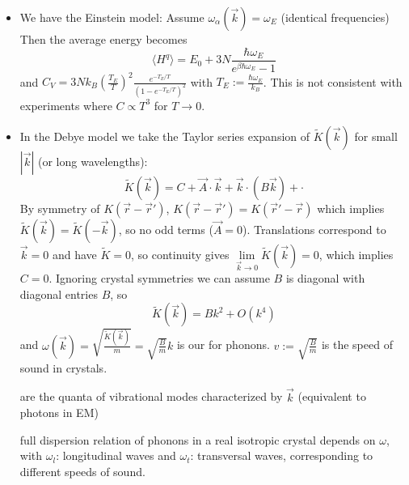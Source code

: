 \documentclass[12pt, a4paper, oneside, openright, titlepage]{book}
\begin{document}
\begin{itemize}
    \item We have the Einstein model: Assume $\omega_{\alpha}(\vec{k}) = \omega_E$ (identical frequencies) Then the average energy becomes \begin{equation*}
            \langle H^q\rangle = E_0 + 3N\frac{\hbar\omega_E}{e^{\beta\hbar\omega_E}-1}
    \end{equation*}
        and $C_V = 3Nk_B\left(\frac{T_E}{T}\right)^2\frac{e^{-T_E/T}}{(1-e^{-T_E/T})^2}$ with $T_E := \frac{\hbar\omega_E}{k_B}$. This is not consistent with experiments where $C \propto T^3$ for $T\rightarrow 0$.
    \item In the Debye model we take the Taylor series expansion of $\tilde{K}(\vec{k})$ for small $|\vec{k}|$ (or long wavelengths): \begin{equation*}
            \tilde{K}(\vec{k}) = C+\vec{A}\cdot\vec{k}+\vec{k}\cdot(B\vec{k})+\cdot
    \end{equation*}
        By symmetry of $K(\vec{r}-\vec{r}')$, $K(\vec{r}-\vec{r}') = K(\vec{r}'-\vec{r})$ which implies $\tilde{K}(\vec{k}) = \tilde{K}(-\vec{k})$, so no odd terms ($\vec{A} = 0$). Translations correspond to $\vec{k} = 0$ and have $\tilde{K} = 0$, so continuity gives $\lim\limits_{\vec{k}\rightarrow 0}\tilde{K}(\vec{k}) = 0$, which implies $C = 0$. Ignoring crystal symmetries we can assume $B$ is diagonal with diagonal entries $B$, so \begin{equation*}
            \tilde{K}(\vec{k}) = Bk^2 + O(k^4)
        \end{equation*}
        and $\omega(\vec{k}) = \sqrt{\frac{\tilde{K}(\vec{k})}{m}} = \sqrt{\frac{B}{m}}k$ is our  for phonons. $v := \sqrt{\frac{B}{m}}$ is the speed of sound in crystals. 
        \begin{defn}
             are the quanta of vibrational modes characterized by $\vec{k}$ (equivalent to photons in EM)
        \end{defn}
        full dispersion relation of phonons in a real isotropic crystal depends on $\omega$, with $\omega_l$: longitudinal waves and $\omega_t$: transversal waves, corresponding to different speeds of sound. 
        

\end{itemize}
\end{document}
